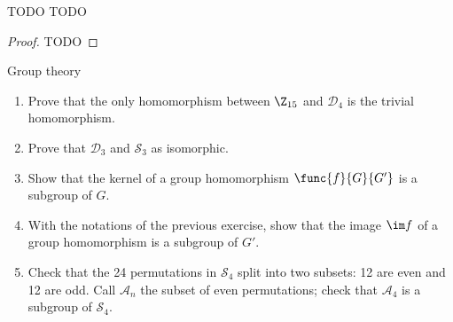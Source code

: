 \documentclass[a4paper, 12pt]{report}
\begin{document}
    \begin{framedprob}{TODO}
        TODO
    \end{framedprob}

    \begin{proof}
        TODO
    \end{proof}

    \begin{framedprob}{Group theory}
        \begin{enumerate}
            \item Prove that the only homomorphism between $\Z_{15}$ and $\mathcal D_4$ is the trivial homomorphism.
            \item Prove that $\mathcal D_3$ and $\mathcal S_3$ as isomorphic.
            \item Show that the kernel of a group homomorphism $\func{f}{G}{G'}$ is a subgroup of $G$.
            \item With the notations of the previous exercise, show that the image $\im f$ of a group homomorphism is a subgroup of $G'$.
            \item Check that the 24 permutations in $\mathcal S_4$ split into two subsets: 12 are even and 12 are odd. Call $\mathcal A_n$ the subset of even permutations; check that $\mathcal A_4$ is a subgroup of $\mathcal S_4$.
        \end{enumerate}
    \end{framedprob}
\end{document}
